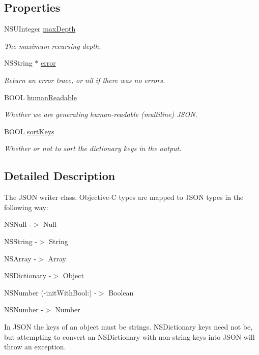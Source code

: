 \subsection*{Properties}
\begin{DoxyCompactItemize}
\item 
NSUInteger \hyperlink{interface_s_b_json_writer_a283b4f65ab4d3e1a8112b37dea432689}{maxDepth}
\begin{DoxyCompactList}\small\item\em The maximum recursing depth. \item\end{DoxyCompactList}\item 
NSString $\ast$ \hyperlink{interface_s_b_json_writer_a9915988454e0ea4111cb05831133b625}{error}
\begin{DoxyCompactList}\small\item\em Return an error trace, or nil if there was no errors. \item\end{DoxyCompactList}\item 
BOOL \hyperlink{interface_s_b_json_writer_a16ca84860a2ee76a03b567dc5181a851}{humanReadable}
\begin{DoxyCompactList}\small\item\em Whether we are generating human-\/readable (multiline) JSON. \item\end{DoxyCompactList}\item 
BOOL \hyperlink{interface_s_b_json_writer_af25807a58a322b56cb5d3593532228e5}{sortKeys}
\begin{DoxyCompactList}\small\item\em Whether or not to sort the dictionary keys in the output. \item\end{DoxyCompactList}\end{DoxyCompactItemize}


\subsection{Detailed Description}
The JSON writer class. Objective-\/C types are mapped to JSON types in the following way:

\begin{DoxyItemize}
\item NSNull -\/$>$ Null \item NSString -\/$>$ String \item NSArray -\/$>$ Array \item NSDictionary -\/$>$ Object \item NSNumber (-\/initWithBool:) -\/$>$ Boolean \item NSNumber -\/$>$ Number\end{DoxyItemize}
In JSON the keys of an object must be strings. NSDictionary keys need not be, but attempting to convert an NSDictionary with non-\/string keys into JSON will throw an exception.

